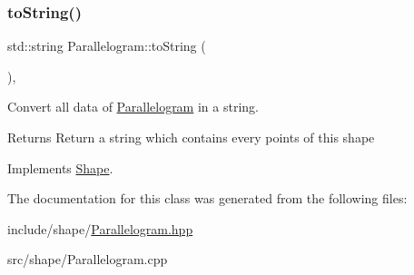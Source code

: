 \mbox{\label{classParallelogram_a9caae0044f23d8a1e87b1a78d852c37f}} 
\subsubsection{\texorpdfstring{to\+String()}{toString()}}
{\footnotesize\ttfamily std\+::string Parallelogram\+::to\+String (\begin{DoxyParamCaption}{ }\end{DoxyParamCaption})\hspace{0.3cm}{\ttfamily [override]}, {\ttfamily [virtual]}}



Convert all data of \hyperlink{classParallelogram}{Parallelogram} in a string. 

\begin{DoxyReturn}{Returns}
Return a string which contains every points of this shape 
\end{DoxyReturn}


Implements \hyperlink{classShape_a98fa87c6dc4c7045fd6897a8f3bc186c}{Shape}.



The documentation for this class was generated from the following files\+:\begin{DoxyCompactItemize}
\item 
include/shape/\hyperlink{Parallelogram_8hpp}{Parallelogram.\+hpp}\item 
src/shape/Parallelogram.\+cpp\end{DoxyCompactItemize}

